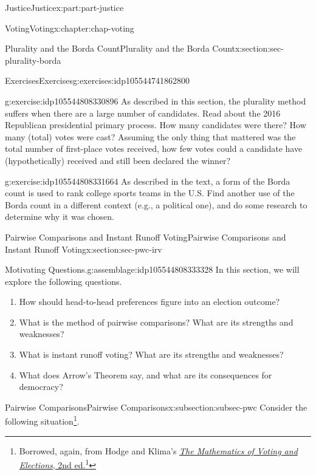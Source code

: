 \documentclass[oneside,10pt,]{book}
\numberwithin{equation}{section}
\begin{document}
\begin{partptx}{Justice}{}{Justice}{}{}{x:part:part-justice}
\begin{chapterptx}{Voting}{}{Voting}{}{}{x:chapter:chap-voting}
\begin{sectionptx}{Plurality and the Borda Count}{}{Plurality and the Borda Count}{}{}{x:section:sec-plurality-borda}
\begin{exercises-subsection}{Exercises}{}{Exercises}{}{}{g:exercises:idp105544741862800}
\begin{divisionexercise}{2}{}{}{g:exercise:idp105544808330896}
As described in this section, the plurality method suffers when there are a large number of candidates. Read about the 2016 Republican presidential primary process. How many candidates were there? How many (total) votes were cast? Assuming the only thing that mattered was the total number of first-place votes received, how few votes could a candidate have (hypothetically) received and still been declared the winner?%
\end{divisionexercise}%
\begin{divisionexercise}{3}{}{}{g:exercise:idp105544808331664}%
As described in the text, a form of the Borda count is used to rank college sports teams in the U.S. Find another use of the Borda count in a different context (e.g., a political one), and do some research to determine why it was chosen.%
\end{divisionexercise}%
\end{exercises-subsection}
\end{sectionptx}
%
%
\typeout{************************************************}
\typeout{************************************************}
%
\begin{sectionptx}{Pairwise Comparisons and Instant Runoff Voting}{}{Pairwise Comparisons and Instant Runoff Voting}{}{}{x:section:sec-pwc-irv}
\begin{assemblage}{Motivating Questions.}{g:assemblage:idp105544808333328}%
In this section, we will explore the following questions. %
\begin{enumerate}
\item{}How should head-to-head preferences figure into an election outcome?%
\item{}What is the method of pairwise comparisons? What are its strengths and weaknesses?%
\item{}What is instant runoff voting? What are its strengths and weaknesses?%
\item{}What does Arrow's Theorem say, and what are its consequences for democracy?%
\end{enumerate}
%
\end{assemblage}
%
%
\typeout{************************************************}
\typeout{************************************************}
%
\begin{subsectionptx}{Pairwise Comparisons}{}{Pairwise Comparisons}{}{}{x:subsection:subsec-pwc}
Consider the following situation\footnote{Borrowed, again, from Hodge and Klima's \href{https://bookstore.ams.org/mawrld-30/}{\emph{The Mathematics of Voting and Elections}, 2nd ed.}\footnote{\nolinkurl{https://bookstore.ams.org/mawrld-30/}\label{g:fn:idp105544808337552}}\label{g:fn:idp105544808336656}}.%

\end{subsectionptx}
\end{sectionptx}
\end{chapterptx}
\end{partptx}
\end{document}
